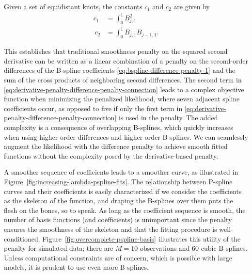 \noindent
Given a set of equidistant knots, the constants $c_1$ and $c_2$ are given by
\begin{equation}
\begin{split}
c_1 & =   \int_0^1 B_{j,1}^2\\\
c_2 & = \int_0^1 B_{j,1}B_{j-1,1}.
\end{split}
\end{equation}


This establishes that traditional smoothness penalty on the squared second derivative can be written as a linear combination of a penalty on the second-order differences of the B-spline coefficients \ref{eq:bspline-difference-penalty-1} and the sum of the cross products of neighboring second differences. The second term in \ref{eq:derivative-penalty-difference-penalty-connection} leads to a complex objective function when minimizing the penalized likelihood, where seven adjacent spline coefficients occur, as opposed to five if only the first term in \ref{eq:derivative-penalty-difference-penalty-connection} is used in the penalty. The added complexity is a consequence of overlapping B-splines, which quickly increases when using higher order differences and higher order B-splines. We can seamlessly augment the likelihood with the difference penalty to achieve smooth fitted functions without the complexity posed by the derivative-based penalty.

\bigskip

A smoother sequence of coefficients leads to a smoother curve, as illustrated in Figure~\ref{fig:increasing-lambda-pspline-fits}.  The relationship between P-spline curves and their coefficients is easily characterized if we consider the coefficients as the skeleton of the function, and draping the B-splines over them puts the flesh on the bones, so to speak. As long as the coefficient sequence is smooth, the number of basis functions (and coefficients) is unimportant since the penalty ensures the smoothness of the skeleton and that the fitting procedure is well-conditioned.  Figure~\ref{fig:overcomplete-pspline-basis} illustrates this utility of the penalty for simulated data; there are $M=10$ observations and $60$ cubic B-splines. Unless computational constraints are of concern, which is possible with large models, it is prudent to use even more B-splines.  

